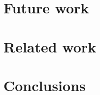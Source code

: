 \documentclass[12pt, oneside]{book}
\begin{document}
\chapter{Future work}


\chapter{Related work}


\chapter{Conclusions}


\clearpage


\end{document}
